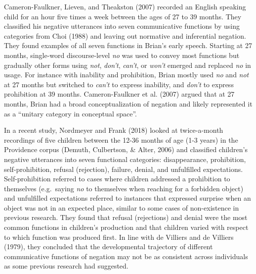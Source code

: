 \documentclass[
  man,floatsintext]{apa6}
\begin{document}
Cameron-Faulkner, Lieven, and Theakston (2007) recorded an English speaking child for an hour five times a week between the ages of 27 to 39 months. They classified his negative utterances into seven communicative functions by using categories from Choi (1988) and leaving out normative and inferential negation. They found examples of all seven functions in Brian's early speech. Starting at 27 months, single-word discourse-level \emph{no} was used to convey most functions but gradually other forms using \emph{not}, \emph{don't}, \emph{can't}, or \emph{won't} emerged and replaced \emph{no} in usage. For instance with inability and prohibition, Brian mostly used \emph{no} and \emph{not} at 27 months but switched to \emph{can't} to express inability, and \emph{don't} to express prohibition at 39 months. Cameron-Faulkner et al. (2007) argued that at 27 months, Brian had a broad conceptualization of negation and likely represented it as a ``unitary category in conceptual space''.

In a recent study, Nordmeyer and Frank (2018) looked at twice-a-month recordings of five children between the 12-36 months of age (1-3 years) in the Providence corpus (Demuth, Culbertson, \& Alter, 2006) and classified children's negative utterances into seven functional categories: disappearance, prohibition, self-prohibition, refusal (rejection), failure, denial, and unfulfilled expectations. Self-prohibition referred to cases where children addressed a prohibition to themselves (e.g.~saying \emph{no} to themselves when reaching for a forbidden object) and unfulfilled expectations referred to instances that expressed surprise when an object was not in an expected place, similar to some cases of non-existence in previous research. They found that refusal (rejections) and denial were the most common functions in children's production and that children varied with respect to which function was produced first. In line with de Villiers and de Villiers (1979), they concluded that the developmental trajectory of different communicative functions of negation may not be as consistent across individuals as some previous research had suggested.
\end{document}
